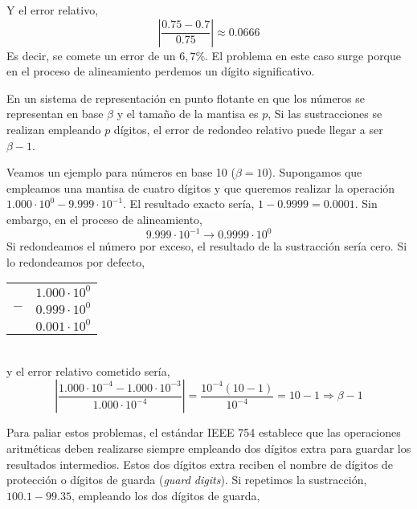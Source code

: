 Y el error relativo,
\begin{equation*}
\left\vert\frac{0.75-0.7}{0.75}\right\vert\approx 0.0666
\end{equation*}
Es decir, se comete un error de un $6,7\%$. El problema en este caso surge porque en el proceso de alineamiento perdemos un dígito significativo.

 En un sistema de representación en punto flotante en que los números se representan en base $\beta$ y el tamaño de la mantisa es $p$, Si las sustracciones se realizan empleando $p$ dígitos, el error de redondeo relativo puede llegar a ser $\beta-1$.
 
Veamos un ejemplo para números en base 10 ($\beta=10$). Supongamos que empleamos una mantisa de cuatro dígitos y que queremos realizar la operación $1.000\cdot10^0-9.999\cdot10^{-1}$. El resultado exacto sería, $1-0.9999=0.0001$. Sin embargo, en el proceso de alineamiento,
\begin{equation*}
9.999\cdot10^{-1}\rightarrow0.9999\cdot10^0
\end{equation*} 
Si redondeamos el número por exceso, el resultado de la sustracción sería cero. Si lo redondeamos por defecto,

\begin{tabular}{c r}
&$1.000\cdot10^0$\\
$-$&$0.999\cdot10^0$\\
\hline
&$0.001\cdot10^0$
\end{tabular}\\

y el error relativo cometido sería,
\begin{equation*}
\left\vert\frac{1.000\cdot10^{-4}-1.000\cdot10^{-3}}{1.000\cdot10^{-4}}\right\vert=\frac{10^{-4}(10-1)}{10^{-4}}=10-1\Rightarrow\beta -1
\end{equation*}


Para paliar estos problemas, el estándar IEEE 754 establece que las operaciones aritméticas deben realizarse siempre empleando dos dígitos extra para guardar los resultados intermedios. Estos dos dígitos extra reciben el nombre de dígitos de protección o dígitos de guarda (\emph{guard digits}).
Si repetimos la sustracción, $100.1-99.35$, empleando los dos dígitos de guarda,

